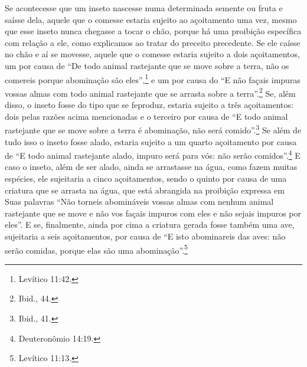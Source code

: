 Se acontecesse que um inseto nascesse numa determinada semente ou fruta
e saísse dela, aquele que o comesse estaria sujeito ao açoitamento uma
vez, mesmo que esse inseto nunca chegasse a tocar o chão, porque há uma
proibição específica com relação a ele, como explicamos ao tratar do
preceito precedente. Se ele caísse no chão e aí se movesse, aquele que
o comesse estaria sujeito a dois açoitamentos, um por causa de ``De todo
animal rastejante que se move sobre a terra, não os comereis porque
abominação são eles'',\footnote{Levítico 11:42.} e um por causa do ``E não façais
impuras vossas almas com todo animal rastejante que se arrasta sobre a
terra''.\footnote{Ibid., 44.} Se, além disso, o inseto fosse do tipo que se
feproduz, estaria sujeito a três açoitamentos: dois pelas razões acima
mencionadas e o terceiro por causa de ``E todo animal rastejante que se
move sobre a terra é abominação, não será comido''.\footnote{Ibid., 41.} Se além
de tudo isso o inseto fosse alado, estaria sujeito a um quarto
açoitamento por causa de ``E todo animal rastejante alado, impuro será
para vós: não serão comidos''.\footnote{Deuteronômio 14:19.} E caso o inseto,
além de ser alado, ainda se arrastasse na água, como fazem muitas
espécies, ele sujeitaria a cinco açoitamentos, sendo o quinto por causa
de uma criatura que se arrasta na água, que está abrangida na proibição
expressa em Suas palavras ``Não torneis abomináveis vossas almas com
nenhum animal rastejante que se move e não vos façais impuros com eles e
não sejais impuros por eles''. E se, finalmente, ainda por cima a
criatura gerada fosse também uma ave, sujeitaria a seis açoitamentos,
por causa de ``E isto abominareis das aves: não serão comidas, porque
elas são uma abominação''.\footnote{Levítico 11:13.}

